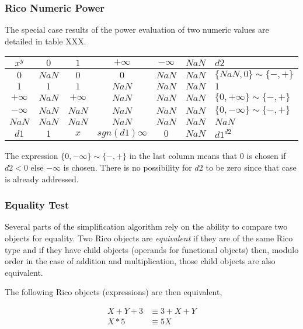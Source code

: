 \subsubsection{Rico Numeric Power}

The special case results of the power evaluation of two numeric values are detailed in table XXX.

\vspace{.1 in}
\begin{tabular}{|c|cccccl||}
\hline
$x^y$     & $0$   & $1$       & $+\infty$ & $-\infty$  & $NaN$ & $d2$\\
\hline \hline
$0$       & $NaN$ & $0$       & $0$       & $NaN$      & $NaN$ & $\{NaN, 0\}    \sim \{-,+\}$\\
$1$       & $1$   & $1$       & $NaN$     & $NaN$      & $NaN$ & $1$ \\
$+\infty$ & $NaN$ & $+\infty$ & $NaN$     & $NaN$      & $NaN$ & $\{0, +\infty\} \sim \{-,+\}$\\
$-\infty$ & $NaN$ & $NaN$     & $NaN$     & $NaN$      & $NaN$ & $\{0, -\infty\} \sim \{-,+\}$\\
$NaN$     & $NaN$ & $NaN$     & $NaN$     & $NaN$      & $NaN$ & $NaN$ \\
$d1$      & $1$   & $x$       & $sgn(d1) \infty$ & $0$ & $NaN$ & ${d1}^{d2}$ \\
\hline
\end{tabular}

The expression $\{0, -\infty\} \sim \{-,+\}$ in the last column means that $0$ is chosen if $d2 < 0$ else $-\infty$ is chosen. There is no possibility for $d2$ to be zero since that case is already addressed.

\subsubsection{Equality Test}

Several parts of the simplification algorithm rely on the ability to compare two objects for equality. Two Rico objects are \emph{equivalent} if they are of the same Rico type and if they have child objects (operands for functional objects) then, modulo order in the case of addition and multiplication, those child objects are also equivalent.

The following Rico objects (expressions) are then equivalent,

\begin{align*}
X+Y+3 &\equiv 3 + X + Y\\
X*5 &\equiv 5X
\end{align*}

